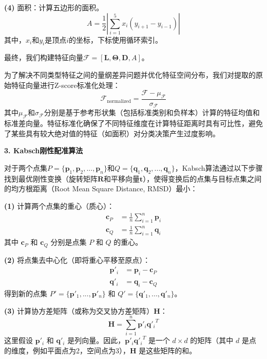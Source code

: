\textbf{(4)} 面积：计算五边形的面积。
\begin{equation}
    A = \frac{1}{2}\left|\sum_{i=1}^{5} x_i(y_{i+1} - y_{i-1})\right|
\end{equation}
其中，$x_i$和$y_i$是顶点$i$的坐标，下标使用循环索引。

最终，我们构建特征向量$\mathcal{F} = [\mathbf{L}, \bm{\Theta}, \mathbf{D}, A]$。

为了解决不同类型特征之间的量纲差异问题并优化特征空间分布，我们对提取的原始特征向量进行Z-score标准化处理：
\begin{equation}
    \mathcal{F}_{\text{normalized}} = \frac{\mathcal{F} - \mu_{\mathcal{F}}}{\sigma_{\mathcal{F}}}
\end{equation}
其中$\mu_{\mathcal{F}}$和$\sigma_{\mathcal{F}}$分别是基于参考形状集（包括标准类别和负样本）计算的特征均值和标准差向量。特征标准化确保了不同特征维度在计算特征距离时具有可比性，避免了某些具有较大绝对值的特征（如面积）对分类决策产生过度影响。

\textbf{3. Kabsch刚性配准算法}

对于两个点集$P = \{\mathbf{p}_1, \mathbf{p}_2, ..., \mathbf{p}_n\}$和$Q = \{\mathbf{q}_1, \mathbf{q}_2, ..., \mathbf{q}_n\}$，Kabsch算法\cite{kabsch1976solution}通过以下步骤找到最优刚性变换（旋转矩阵$\mathbf{R}$和平移向量$\mathbf{t}$），使得变换后的点集与目标点集之间的均方根距离（Root Mean Square Distance, RMSD）最小：

\textbf{(1)} 计算两个点集的重心（质心）：
\begin{align}
    \mathbf{c}_P &= \frac{1}{n}\sum_{i=1}^{n}\mathbf{p}_i \\
    \mathbf{c}_Q &= \frac{1}{n}\sum_{i=1}^{n}\mathbf{q}_i
\end{align}
其中 $\mathbf{c}_P$ 和 $\mathbf{c}_Q$ 分别是点集 $P$ 和 $Q$ 的重心。

\textbf{(2)} 将点集去中心化（即将重心平移至原点）：
\begin{align}
    \mathbf{p}'_i &= \mathbf{p}_i - \mathbf{c}_P \\
    \mathbf{q}'_i &= \mathbf{q}_i - \mathbf{c}_Q
\end{align}
得到新的点集 $P' = \{\mathbf{p}'_1, ..., \mathbf{p}'_n\}$ 和 $Q' = \{\mathbf{q}'_1, ..., \mathbf{q}'_n\}$。

\textbf{(3)} 计算协方差矩阵（或称为交叉协方差矩阵）$\mathbf{H}$：
\begin{equation}
    \mathbf{H} = \sum_{i=1}^{n}\mathbf{p}'_i {\mathbf{q}'_i}^T
\end{equation}
这里假设 $\mathbf{p}'_i$ 和 $\mathbf{q}'_i$ 是列向量。因此，$\mathbf{p}'_i {\mathbf{q}'_i}^T$ 是一个 $d \times d$ 的矩阵（其中 $d$ 是点的维度，例如平面点为2，空间点为3），$\mathbf{H}$ 是这些矩阵的和。

